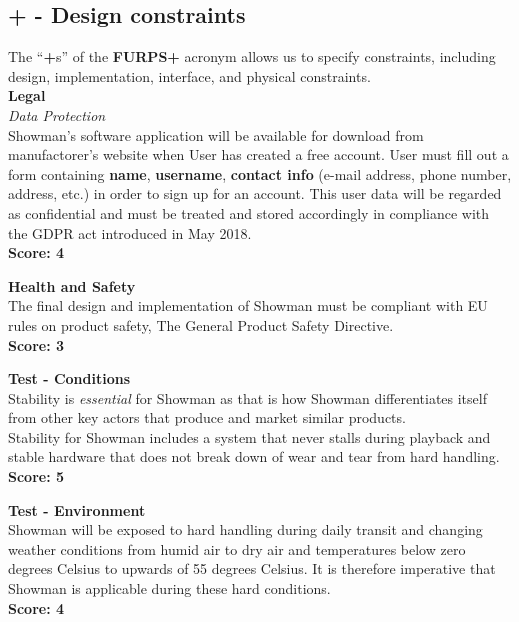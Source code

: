 \subsection{\textbf{+} - Design constraints}
The “\textbf{+}s” of the \textbf{FURPS+} acronym allows us to specify constraints, including design, implementation, interface, and physical constraints. \\

\textbf{Legal} \\
\textit{Data Protection} \\
Showman's software application will be available for download from manufactorer's website when User has created a free account. User must fill out a form containing \textbf{name}, \textbf{username}, \textbf{contact info} (e-mail address, phone number, address, etc.) in order to sign up for an account. This user data will be regarded as confidential and must be treated and stored accordingly in compliance with the GDPR act introduced in May 2018. \\
\textbf{Score: 4} \newline

\textbf{Health and Safety} \\
The final design and implementation of Showman must be compliant with EU rules on product safety, The General Product Safety Directive. \\
\textbf{Score: 3} \newline

\textbf{Test - Conditions} \\
Stability is \textit{essential} for Showman as that is how Showman differentiates itself from other key actors that produce and market similar products. \\
Stability for Showman includes a system that never stalls during playback and stable hardware that does not break down of wear and tear from hard handling. \\
\textbf{Score: 5} \newline

\textbf{Test - Environment} \\
Showman will be exposed to hard handling during daily transit and changing weather conditions from humid air to dry air and temperatures below zero degrees Celsius to upwards of 55 degrees Celsius. It is therefore imperative that Showman is applicable during these hard conditions. \\
\textbf{Score: 4} \newline

